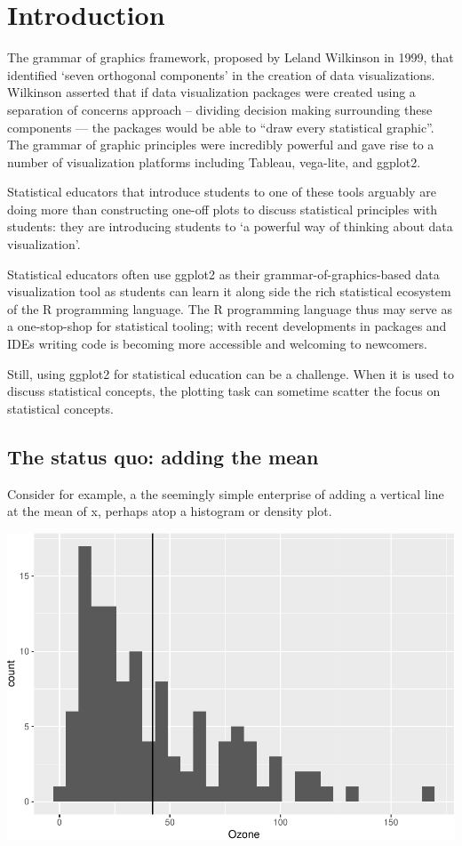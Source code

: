 \documentclass[12pt]{article}
\begin{document}
\hypertarget{introduction}{%
\section{Introduction}\label{introduction}}

The grammar of graphics framework, proposed by Leland Wilkinson in 1999,
that identified `seven orthogonal components' in the creation of data
visualizations.\\
Wilkinson asserted that if data visualization packages were created
using a separation of concerns approach -- dividing decision making
surrounding these components --- the packages would be able to ``draw
every statistical graphic''. The grammar of graphic principles were
incredibly powerful and gave rise to a number of visualization platforms
including Tableau, vega-lite, and ggplot2.

Statistical educators that introduce students to one of these tools
arguably are doing more than constructing one-off plots to discuss
statistical principles with students: they are introducing students to
`a powerful way of thinking about data visualization'.

Statistical educators often use ggplot2 as their
grammar-of-graphics-based data visualization tool as students can learn
it along side the rich statistical ecosystem of the R programming
language. The R programming language thus may serve as a one-stop-shop
for statistical tooling; with recent developments in packages and IDEs
writing code is becoming more accessible and welcoming to newcomers.

Still, using ggplot2 for statistical education can be a challenge. When
it is used to discuss statistical concepts, the plotting task can
sometime scatter the focus on statistical concepts.

\hypertarget{the-status-quo-adding-the-mean}{%
\subsection{The status quo: adding the
mean}\label{the-status-quo-adding-the-mean}}

Consider for example, a the seemingly simple enterprise of adding a
vertical line at the mean of x, perhaps atop a histogram or density
plot.

\begin{center}\includegraphics[width=0.5\linewidth]{manuscript_files/figure-latex/unnamed-chunk-2-1} \end{center}
\end{document}

